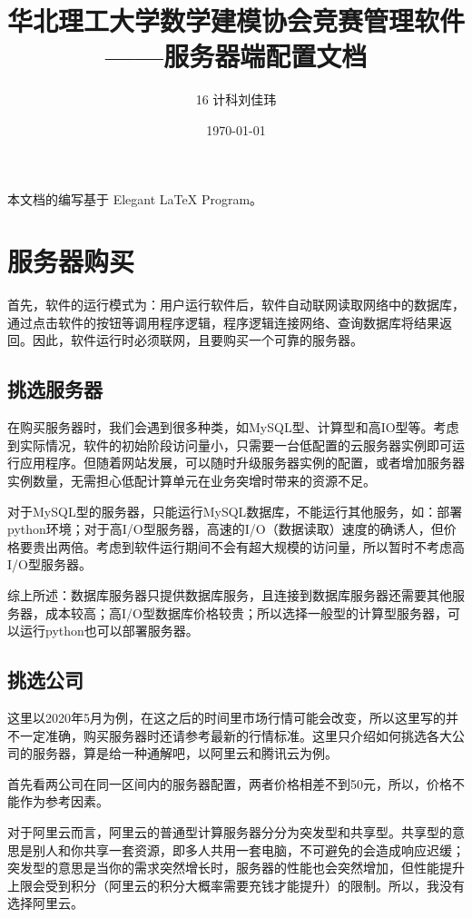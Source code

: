 \documentclass[lang=cn,hazy,normal,blue,12pt]{elegantnote}
\title{华北理工大学数学建模协会竞赛管理软件\\——服务器端配置文档}
\author{16 计科刘佳玮}
\date{\today}
\begin{document}
\maketitle
\tableofcontents
\newpage

本文档的编写基于 Elegant \LaTeX{} Program。

\section{服务器购买}

首先，软件的运行模式为：用户运行软件后，软件自动联网读取网络中的数据库，通过点击软件的按钮等调用程序逻辑，程序逻辑连接网络、查询数据库将结果返回。因此，软件运行时必须联网，且要购买一个可靠的服务器。

\subsection{挑选服务器}

在购买服务器时，我们会遇到很多种类，如MySQL型、计算型和高IO型等。考虑到实际情况，软件的初始阶段访问量小，只需要一台低配置的云服务器实例即可运行应用程序。但随着网站发展，可以随时升级服务器实例的配置，或者增加服务器实例数量，无需担心低配计算单元在业务突增时带来的资源不足。

对于MySQL型的服务器，只能运行MySQL数据库，不能运行其他服务，如：部署python环境；对于高I/O型服务器，高速的I/O（数据读取）速度的确诱人，但价格要贵出两倍。考虑到软件运行期间不会有超大规模的访问量，所以暂时不考虑高I/O型服务器。

综上所述：数据库服务器只提供数据库服务，且连接到数据库服务器还需要其他服务器，成本较高；高I/O型数据库价格较贵；所以选择一般型的计算型服务器，可以运行python也可以部署服务器。

\subsection{挑选公司}

这里以2020年5月为例，在这之后的时间里市场行情可能会改变，所以这里写的并不一定准确，购买服务器时还请参考最新的行情标准。这里只介绍如何挑选各大公司的服务器，算是给一种通解吧，以阿里云和腾讯云为例。

首先看两公司在同一区间内的服务器配置，两者价格相差不到50元，所以，价格不能作为参考因素。

对于阿里云而言，阿里云的普通型计算服务器分分为突发型和共享型。共享型的意思是别人和你共享一套资源，即多人共用一套电脑，不可避免的会造成响应迟缓；突发型的意思是当你的需求突然增长时，服务器的性能也会突然增加，但性能提升上限会受到积分（阿里云的积分大概率需要充钱才能提升）的限制。所以，我没有选择阿里云。
\end{document}
